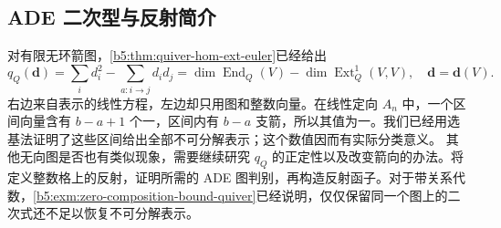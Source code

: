 \subsection{ADE 二次型与反射简介}
\label{b5:subsec:0905:05}

对有限无环箭图，\cref{b5:thm:quiver-hom-ext-euler}已经给出
\[
	q_Q(\mathbf d)=\sum_i d_i^2-\sum_{a:i\to j}d_i d_j =\dim\operatorname{End}_Q(V)-\dim\operatorname{Ext}_Q^1(V,V), \quad \mathbf d=\mathbf d(V).
\]
右边来自表示的线性方程，左边却只用图和整数向量。在线性定向 \(A_n\) 中，一个区间向量含有 \(b-a+1\) 个一，区间内有 \(b-a\) 支箭，所以其值为一。我们已经用选基法证明了这些区间给出全部不可分解表示；这个数值因而有实际分类意义。
\ProseParagraphBreak
其他无向图是否也有类似现象，需要继续研究 \(q_Q\) 的正定性以及改变箭向的办法。将定义整数格上的反射，证明所需的 ADE 图判别，再构造反射函子。对于带关系代数，\cref{b5:exm:zero-composition-bound-quiver}已经说明，仅仅保留同一个图上的二次式还不足以恢复不可分解表示。
